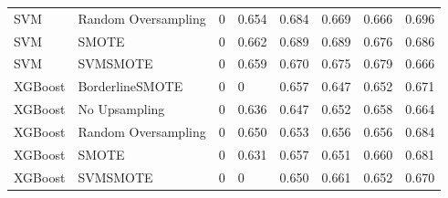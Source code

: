 \begin{tabular}{llllllll}
                         SVM & Random Oversampling &     0 &                     0.654 &                 0.684 &                  0.669 &                                   0.666 &     0.696 \\
                         SVM &               SMOTE &     0 &                     0.662 &                 0.689 &                  0.689 &                                   0.676 &     0.686 \\
                         SVM &            SVMSMOTE &     0 &                     0.659 &                 0.670 &                  0.675 &                                   0.679 &     0.666 \\
                     XGBoost &     BorderlineSMOTE &     0 &                         0 &                 0.657 &                  0.647 &                                   0.652 &     0.671 \\
                     XGBoost &       No Upsampling &     0 &                     0.636 &                 0.647 &                  0.652 &                                   0.658 &     0.664 \\
                     XGBoost & Random Oversampling &     0 &                     0.650 &                 0.653 &                  0.656 &                                   0.656 &     0.684 \\
                     XGBoost &               SMOTE &     0 &                     0.631 &                 0.657 &                  0.651 &                                   0.660 &     0.681 \\
                     XGBoost &            SVMSMOTE &     0 &                         0 &                 0.650 &                  0.661 &                                   0.652 &     0.670 \\
\bottomrule
\end{tabular}
